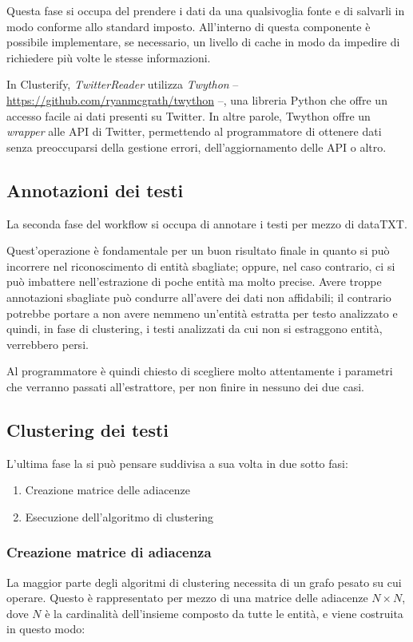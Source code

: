 		Questa fase si occupa del prendere i dati da una qualsivoglia fonte e di salvarli in modo conforme allo standard imposto. All'interno di questa componente è possibile implementare, se necessario, un livello di cache in modo da impedire di richiedere più volte le stesse informazioni.

		In Clusterify, \emph{TwitterReader} utilizza \emph{Twython}  -- \url{https://github.com/ryanmcgrath/twython} --, una libreria Python che offre un accesso facile ai dati presenti su Twitter. In altre parole, Twython offre un \emph{wrapper} alle API di Twitter, permettendo al programmatore di ottenere dati senza preoccuparsi della gestione errori, dell'aggiornamento delle API o altro. 

	\subsection{Annotazioni dei testi}
		La seconda fase del workflow si occupa di annotare i testi per mezzo di dataTXT.
		
		Quest'operazione è fondamentale per un buon risultato finale in quanto si può  incorrere nel riconoscimento di entità sbagliate; oppure, nel caso contrario, ci si può imbattere nell'estrazione di poche entità ma molto precise. Avere troppe annotazioni sbagliate può condurre all'avere dei dati non affidabili; il contrario potrebbe portare a non avere nemmeno un'entità estratta per testo analizzato e quindi, in fase di clustering, i testi analizzati da cui non si estraggono entità, verrebbero persi.

		Al programmatore è quindi chiesto di scegliere molto attentamente i parametri che verranno passati all'estrattore, per non finire in nessuno dei due casi.

	\subsection{Clustering dei testi}
		L'ultima fase la si può pensare suddivisa a sua volta in due sotto fasi:

		\begin{enumerate}
  			\item Creazione matrice delle adiacenze
  			\item Esecuzione dell'algoritmo di clustering
		\end{enumerate} 

		\subsubsection{Creazione matrice di adiacenza}
			La maggior parte degli algoritmi di clustering necessita di un grafo pesato su cui operare. Questo è rappresentato per mezzo di una matrice delle adiacenze $N \times N$, dove $N$ è la cardinalità dell'insieme composto da tutte le entità, e viene costruita in questo modo:

